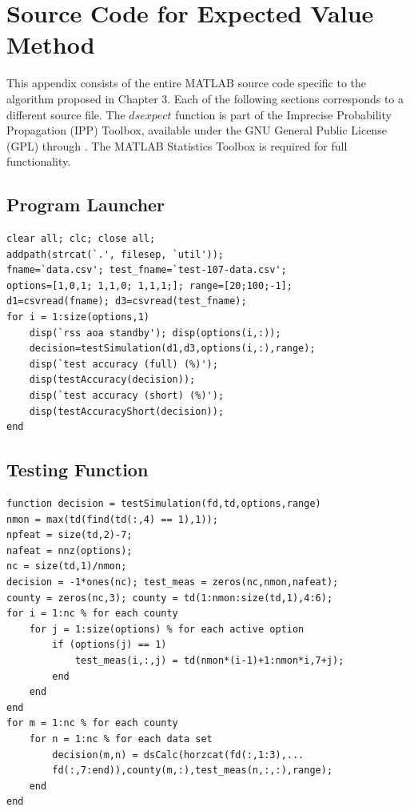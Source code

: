 \documentclass[12pt]{uthesis-v12}  %
\begin{document}
\chapter{Source Code for Expected Value Method}

This appendix consists of the entire MATLAB source code specific to the algorithm proposed in Chapter 3. Each of the following sections corresponds to a different source file. The $dsexpect$ function is part of the Imprecise Probability Propagation (IPP) Toolbox, available under the GNU General Public License (GPL) through \cite{ipp}. The MATLAB Statistics Toolbox is required for full functionality.

\section{Program Launcher}

\begin{verbatim}
clear all; clc; close all; 
addpath(strcat(`.', filesep, `util'));
fname=`data.csv'; test_fname=`test-107-data.csv';
options=[1,0,1; 1,1,0; 1,1,1;]; range=[20;100;-1];
d1=csvread(fname); d3=csvread(test_fname);
for i = 1:size(options,1)
    disp(`rss aoa standby'); disp(options(i,:));
    decision=testSimulation(d1,d3,options(i,:),range);
    disp(`test accuracy (full) (%)');
    disp(testAccuracy(decision));
    disp(`test accuracy (short) (%)');
    disp(testAccuracyShort(decision));
end
\end{verbatim}

\section{Testing Function}

\begin{verbatim}
function decision = testSimulation(fd,td,options,range)
nmon = max(td(find(td(:,4) == 1),1)); 
npfeat = size(td,2)-7; 
nafeat = nnz(options); 
nc = size(td,1)/nmon; 
decision = -1*ones(nc); test_meas = zeros(nc,nmon,nafeat);
county = zeros(nc,3); county = td(1:nmon:size(td,1),4:6);
for i = 1:nc % for each county
    for j = 1:size(options) % for each active option
        if (options(j) == 1)
            test_meas(i,:,j) = td(nmon*(i-1)+1:nmon*i,7+j);
        end
    end
end
for m = 1:nc % for each county
    for n = 1:nc % for each data set
        decision(m,n) = dsCalc(horzcat(fd(:,1:3),...
        fd(:,7:end)),county(m,:),test_meas(n,:,:),range);
    end
end
\end{verbatim}
\end{document}
